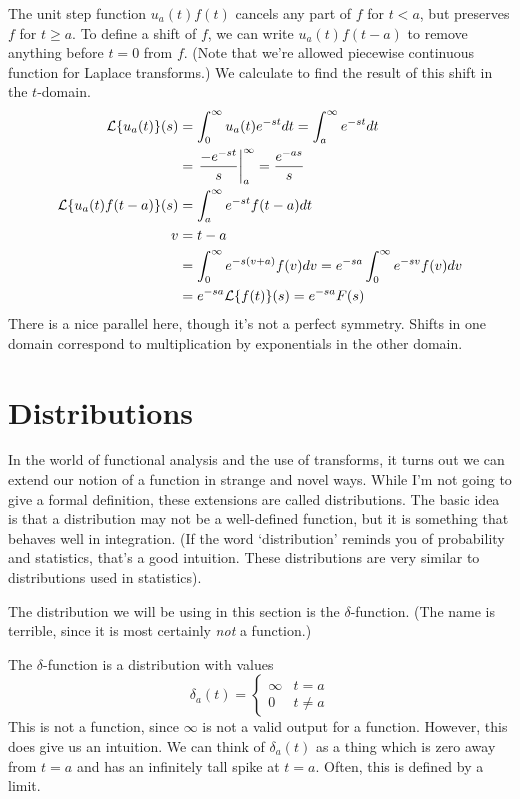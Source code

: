 \documentclass[fleqn,letterpaper]{report}
\begin{document}
The unit step function $u_a(t) f(t)$ cancels any part of $f$
for $t<a$, but preserves $f$ for $t \geq a$. To define a shift
of $f$, we can write $u_a(t) f(t-a)$ to remove anything before
$t=0$ from $f$. (Note that we're allowed piecewise continuous
function for Laplace transforms.) We calculate to find the
result of this shift in the $t$-domain.
\begin{align*}
\mathcal{L} \{ u_a(t) \} (s) & = \int_0^\infty u_a(t) e^{-st} dt =
\int_a^\infty e^{-st} dt \\
 & = \left. \frac{-e^{-st}}{s} \right|_a^\infty =
\frac{e^{-as}}{s} \\
\mathcal{L} \{ u_a (t) f(t-a)\} (s) & = \int_a^\infty e^{-st} f(t-a) dt
\\
v & = t-a \\
& = \int_0^\infty e^{-s(v+a)} f(v) dv = e^{-sa} \int_0^\infty
e^{-sv} f(v) dv \\
& = e^{-sa} \mathcal{L} \{ f(t) \} (s) = e^{-sa} F(s)
\end{align*} 
There is a nice parallel here, though it's not a perfect
symmetry. Shifts in one domain correspond to
multiplication by exponentials in the other domain.

\section{Distributions}
\label{distributions}

In the world of functional analysis and the use of transforms,
it turns out we can extend our notion of a function in strange
and novel ways. While I'm not going to give a formal
definition, these extensions are called distributions. The
basic idea is that a distribution may not be a well-defined
function, but it is something that behaves well in
integration. (If the word `distribution' reminds you of
probability and statistics, that's a good intuition. These
distributions are very similar to distributions used in
statistics).

The distribution we will be using in this section is the
$\delta$-function. (The name is terrible, since it is most
certainly \emph{not} a function.) 

\begin{defn}
The $\delta$-function is a distribution with values
\begin{equation*}
\delta_a(t) = \left\{ \begin{matrix} \infty & t = a \\ 0 & t
\neq a \end{matrix} \right.
\end{equation*}
This is not a function, since $\infty$ is not a valid
output for a function. However, this does give us an intuition.
We can think of $\delta_a(t)$ as a thing which is zero away
from $t=a$ and has an infinitely tall spike at $t=a$. Often,
this is defined by a limit. 
\end{defn}
\end{document}

